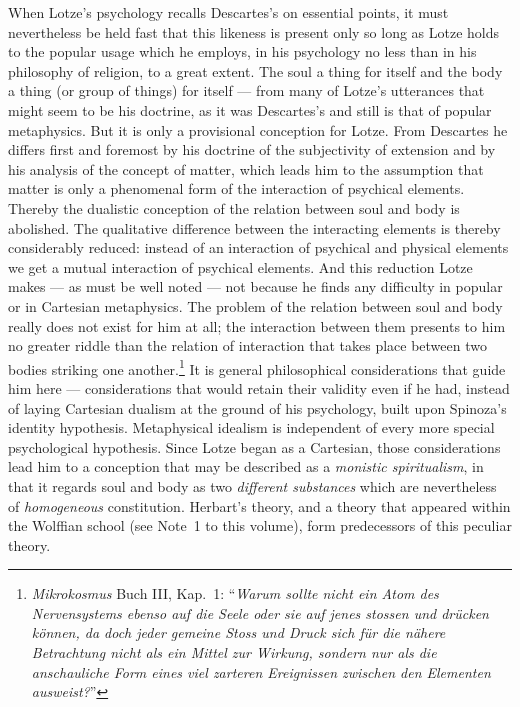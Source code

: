 \documentclass[12pt,a4paper]{book}
\newcommand{\opage}[1]{\marginnote{\footnotesize\textit{[#1]}}}
\begin{document}
When Lotze's psychology recalls Descartes's on essential points, it must
nevertheless be held fast that this likeness is present only so long as Lotze
holds to the popular usage which he employs, in his psychology no less than in
his philosophy of religion, to a great extent. The soul a thing for itself and
the body a thing (or group of things) for itself --- from many of Lotze's
utterances that might seem to be his doctrine, as it was Descartes's and still is
that of popular metaphysics. But it is only a provisional conception for Lotze.
From Descartes he differs first and foremost by his doctrine of the subjectivity
of extension and by his analysis of the concept of matter, which leads him to the
assumption that matter is only a phenomenal form of the interaction of psychical
elements. Thereby the dualistic conception of the relation between soul and body
is abolished. The qualitative difference between the interacting elements is
thereby considerably reduced: instead of an interaction of psychical and physical
elements we get a mutual interaction of psychical elements. And this reduction
Lotze makes --- as must be well noted --- not because he finds any difficulty in
popular or in Cartesian metaphysics. The problem of the relation between soul and
body really does not exist for him at all; the interaction between them presents
to him no greater riddle than the relation of interaction that takes place
between two bodies striking one another.\footnote{\textit{Mikrokosmus} Buch III,
Kap.~1: ``\textit{Warum sollte nicht ein Atom des Nervensystems ebenso auf die
Seele oder sie auf jenes stossen und drücken können, da doch jeder gemeine Stoss
und Druck sich für die nähere Betrachtung nicht als ein Mittel zur Wirkung,
sondern nur als die anschauliche Form eines viel zarteren Ereignissen zwischen
den Elementen ausweist?}''} It is general philosophical considerations that guide
him here --- considerations that would retain their validity even if he had,
instead of laying Cartesian dualism at the ground of his psychology, built upon
Spinoza's identity hypothesis. Metaphysical idealism is independent of every more
special psychological hypothesis. Since Lotze began as a Cartesian, those
considerations lead \opage{525}him to a conception that may be described as a
\emph{monistic spiritualism}, in that it regards soul and body as two
\emph{different substances} which are nevertheless of \emph{homogeneous}
constitution. Herbart's theory, and a theory that appeared within the Wolffian
school (see Note~1 to this volume), form predecessors of this peculiar theory.
\end{document}
